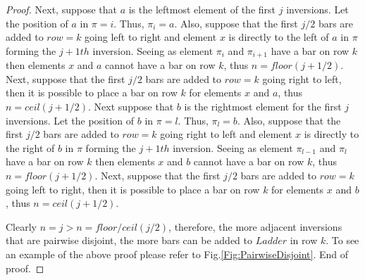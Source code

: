 \begin{proof}
    Next, suppose that $a$ is  the leftmost element of the first $j$ inversions. Let the position of $a$ in $\pi=i$. 
    Thus, $\pi_{i}=a$.  
    Also, suppose that the first $j/2$ bars are added to $row=k$ going left to right and element $x$ is directly to the left of $a$ 
    in $\pi$ forming  the $j+1th$ inversion. 
    Seeing as element $\pi_{i}$ and $\pi_{i+1}$ have a bar on row $k$ then elements $x$ and $a$ cannot have a bar on row $k$, 
    thus $n=floor(j+1/2)$. Next, suppose that the first $j/2$ bars are added to $row=k$ going right to left, then it is possible to place a 
    bar on row $k$ for elements $x$ and $a$, thus $n=ceil(j+1/2)$. Next suppose that $b$ is the rightmost element for the first 
    $j$ inversions. Let the position of $b$ in $\pi=l$. Thus, $\pi_{l}=b$. Also, suppose that the first $j/2$ bars are added to 
    $row=k$ going right to left and element $x$ is directly to the right of $b$ in $\pi$ forming the $j+1th$ inversion.
    Seeing as element $\pi_{l-1}$ and $\pi_{l}$ have a bar on row $k$ then elements $x$ and $b$ cannot have a bar on row $k$, 
    thus $n=floor(j+1/2)$.
    Next, suppose that the first $j/2$ bars are added to $row=k$ going left to right, then it is possible to place a 
    bar on row $k$ for elements $x$ and $b$, thus $n=ceil(j+1/2)$.

    Clearly $n=j>n=floor/ceil(j/2)$, therefore, the more adjacent inversions that are pairwise disjoint, the more bars 
    can be added to $Ladder$ in row $k$.
    To see an example of the above proof please refer to Fig.\ref{Fig:PairwiseDisjoint}. End of proof.

\end{proof}   



